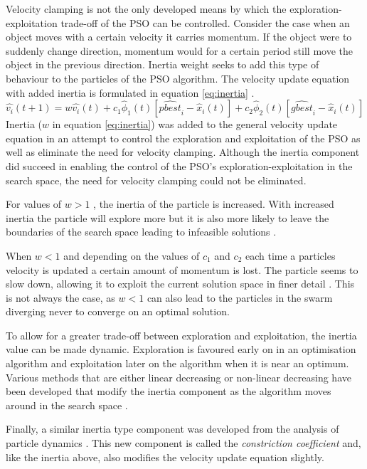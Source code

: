 Velocity clamping is not the only developed means by which  the exploration-exploitation trade-off of the \gls{PSO} can be controlled. Consider the case when an object moves with a certain velocity it carries momentum. If the object were to suddenly change direction, momentum would for a certain period still move the object in the previous direction. Inertia weight seeks to add this type of behaviour to the particles of the \gls{PSO} algorithm. The velocity update equation with added inertia is formulated in equation \ref{eq:inertia} \cite{FundamentalSwarm}.
\begin{equation}
\hat{v_i}(t+1) = w\hat{v_i}(t) + c_1\hat{\phi}_1(t)[\hat{pbest}_i - \hat{x}_i(t)] + c_2\hat{\phi}_2(t)[\hat{gbest}_i - \hat{x}_i(t)]\label{eq:inertia}
\end{equation}
Inertia ($w$ in equation \ref{eq:inertia}) was added to the general velocity update equation in an attempt to control the exploration and exploitation of the \gls{PSO} as well as eliminate the need for velocity clamping\cite{FundamentalSwarm}. Although the inertia component did succeed in enabling the control of the \gls{PSO}'s exploration-exploitation in the search space, the need for velocity clamping could not be eliminated\cite{FundamentalSwarm}.

For values of $w > 1$ , the inertia of the particle is increased. With increased inertia the particle will explore more but it is also more likely to leave the boundaries of the search space leading to infeasible solutions \cite{FundamentalSwarm}. 

When $w < 1$ and depending on the values of $c_1$ and $c_2$ each time a particles velocity is updated a certain amount of momentum is lost. The particle seems to slow down, allowing it to exploit the current solution space in finer detail \cite{FundamentalSwarm}. This is not always the case, as $w < 1$ can also lead to the particles in the swarm diverging never to converge on an optimal solution.

To allow for a greater trade-off between exploration and exploitation, the inertia value can be made dynamic. Exploration is favoured early on in an optimisation algorithm and  exploitation later on the algorithm when it is near an optimum. Various methods that are either linear decreasing or non-linear decreasing have been developed that modify the inertia component as the algorithm moves around in the search space \cite{CompuIntelligenceIntro,FundamentalSwarm}.

Finally, a similar inertia type component was developed from the analysis of particle dynamics \cite{FundamentalSwarm}. This new component is called the \emph{constriction coefficient} and, like the inertia above, also modifies the velocity update equation slightly\cite{adaptPSO,FundamentalSwarm,CompuIntelligenceIntro}. 

